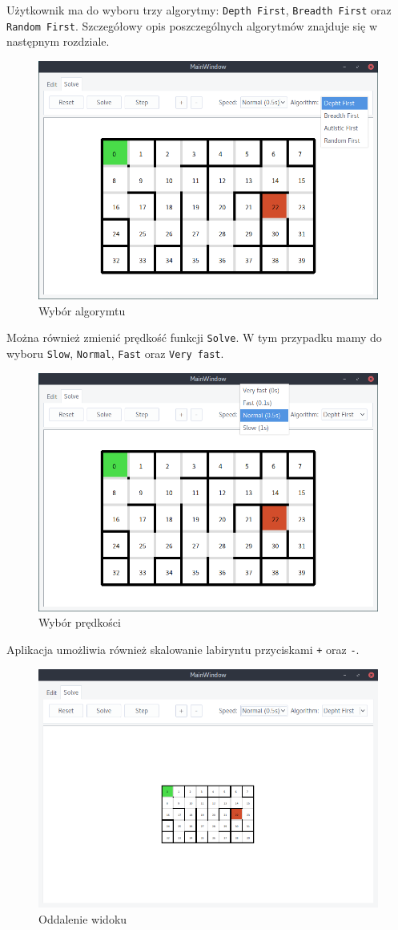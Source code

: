 \documentclass[12pt,a4paper]{article}
\begin{document}
	
	Użytkownik ma do wyboru trzy algorytmy: \texttt{Depth First},
	\texttt{Breadth First} oraz \texttt{Random First}. Szczegółowy
	opis poszczególnych algorytmów znajduje się w następnym rozdziale.
	\begin{figure}[H]
		\centering
		\includegraphics[width=0.8\linewidth]{obrazki/9_new.png}
		\caption{Wybór algorymtu}
	\end{figure}
	
	
	Można również zmienić prędkość funkcji \texttt{Solve}. W tym
	przypadku mamy do wyboru \texttt{Slow}, \texttt{Normal},
	\texttt{Fast} oraz \texttt{Very fast}.
	\begin{figure}[H]
		\centering
		\includegraphics[width=0.8\linewidth]{obrazki/10_new.png}
		\caption{Wybór prędkości}
	\end{figure}
	
	
	Aplikacja umożliwia również skalowanie labiryntu przyciskami
	\texttt{{+}} oraz \texttt{{-}}.
	\begin{figure}[H]
		\centering
		\includegraphics[width=0.8\linewidth]{obrazki/11.png}
		\caption{Oddalenie widoku}
	\end{figure}
	
\end{document}
